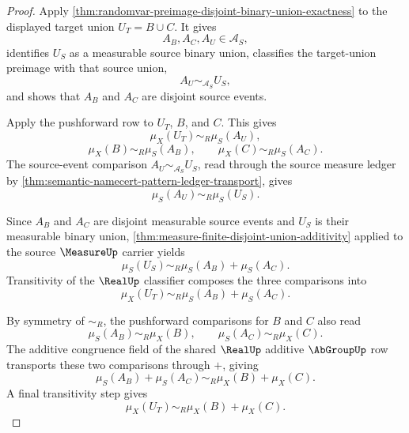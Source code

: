 \begin{proof}
Apply \autoref{thm:randomvar-preimage-disjoint-binary-union-exactness} to the displayed target union $U_T=B\cup C$. It gives
$$
A_B,A_C,A_U\in\mathcal{A}_S,
$$
identifies $U_S$ as a measurable source binary union, classifies the target-union preimage with that source union,
$$
A_U\sim_{\mathcal{A}_S}U_S,
$$
and shows that $A_B$ and $A_C$ are disjoint source events.

Apply the pushforward row to $U_T$, $B$, and $C$. This gives
$$
\mu_X(U_T)\sim_R\mu_S(A_U),
$$
$$
\mu_X(B)\sim_R\mu_S(A_B),\qquad \mu_X(C)\sim_R\mu_S(A_C).
$$
The source-event comparison $A_U\sim_{\mathcal{A}_S}U_S$, read through the source measure ledger by \autoref{thm:semantic-namecert-pattern-ledger-transport}, gives
$$
\mu_S(A_U)\sim_R\mu_S(U_S).
$$

Since $A_B$ and $A_C$ are disjoint measurable source events and $U_S$ is their measurable binary union, \autoref{thm:measure-finite-disjoint-union-additivity} applied to the source $\MeasureUp$ carrier yields
$$
\mu_S(U_S)\sim_R\mu_S(A_B)+\mu_S(A_C).
$$
Transitivity of the $\RealUp$ classifier composes the three comparisons into
$$
\mu_X(U_T)\sim_R\mu_S(A_B)+\mu_S(A_C).
$$

By symmetry of $\sim_R$, the pushforward comparisons for $B$ and $C$ also read
$$
\mu_S(A_B)\sim_R\mu_X(B),\qquad \mu_S(A_C)\sim_R\mu_X(C).
$$
The additive congruence field of the shared $\RealUp$ additive $\AbGroupUp$ row transports these two comparisons through $+$, giving
$$
\mu_S(A_B)+\mu_S(A_C)\sim_R\mu_X(B)+\mu_X(C).
$$
A final transitivity step gives
$$
\mu_X(U_T)\sim_R\mu_X(B)+\mu_X(C).
$$
\end{proof}


